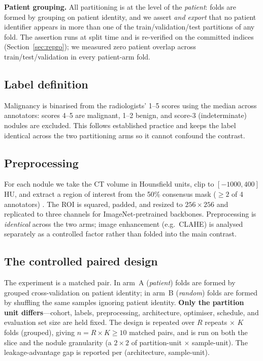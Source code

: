 \documentclass{article}
\newcommand{\vcite}[1]{\cite{#1}}
\begin{document}
\textbf{Patient grouping.} All partitioning is at the level of the \emph{patient}: folds are formed
by grouping on patient identity, and we assert \emph{and export} that no patient identifier appears
in more than one of the train/validation/test partitions of any fold. The assertion runs at split
time and is re-verified on the committed indices (Section~\ref{sec:repro}); we measured zero
patient overlap across train/test/validation in every patient-arm fold.

\subsection{Label definition}
Malignancy is binarised from the radiologists' 1--5 scores using the median across annotators:
scores 4--5 are malignant, 1--2 benign, and score-3 (indeterminate) nodules are excluded. This
follows established practice and keeps the label identical across the two partitioning arms so it
cannot confound the contrast.

\subsection{Preprocessing}
For each nodule we take the CT volume in Hounsfield units, clip to $[-1000, 400]$ HU, and extract
a region of interest from the 50\% consensus mask ($\geq 2$ of 4 annotators)
\vcite{kubota2011}. The ROI is squared, padded, and resized to $256\times256$ and replicated to
three channels for ImageNet-pretrained backbones. Preprocessing is \emph{identical} across the two
arms; image enhancement (e.g.\ CLAHE) is analysed separately as a controlled factor rather than
folded into the main contrast.

\subsection{The controlled paired design}
The experiment is a matched pair. In arm~A (\emph{patient}) folds are formed by grouped
cross-validation on patient identity; in arm~B (\emph{random}) folds are formed by shuffling the
same samples ignoring patient identity. \textbf{Only the partition unit differs}---cohort, labels,
preprocessing, architecture, optimiser, schedule, and evaluation set size are held fixed. The
design is repeated over $R$ repeats $\times$ $K$ folds (grouped), giving
$n = R\times K \ge 10$ matched pairs, and is run on both the slice and the nodule granularity
(a $2\times2$ of partition-unit $\times$ sample-unit). The leakage-advantage gap is reported per
(architecture, sample-unit).
\end{document}
